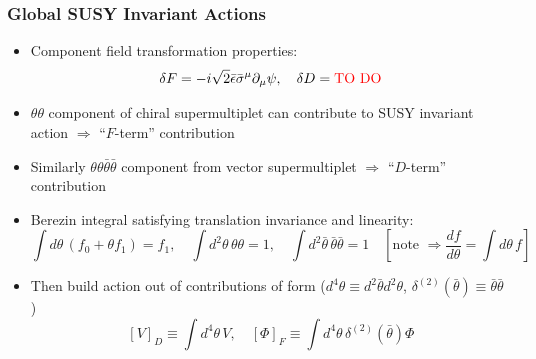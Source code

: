 \documentclass[10pt,aspectratio=169]{beamer}
\begin{document}
\begin{frame}
  \frametitle{Global SUSY Invariant Actions}
  \begin{itemize}\itemsep1em
  \item Component field transformation properties:
    \begin{equation*}
      \delta F = -i \sqrt{2} \bar{\epsilon} \bar{\sigma}^\mu \partial_\mu \psi ,
      \quad \delta D = {\color{red} \text{TO DO}}
    \end{equation*}
  \item $\theta \theta$ component of chiral supermultiplet
    can contribute to SUSY invariant action $\Rightarrow$ {\color{blue}
      ``$F$-term'' contribution}
  \item Similarly $\theta\theta\bar{\theta}\bar{\theta}$ component
    from vector supermultiplet $\Rightarrow$ {\color{blue} ``$D$-term''
      contribution}
  \item Berezin integral satisfying translation invariance and linearity:
    \begin{equation*}
      \int d\theta \, (f_0 + \theta f_1) = f_1 , \quad
      \int d^2 \theta \, \theta \theta = 1 , \quad
      \int d^2 \bar{\theta} \, \bar{\theta} \bar{\theta} = 1 \quad
      \left [ \text{note } \Rightarrow \frac{d f}{d\theta} = \int d\theta\,
        f \right ]
    \end{equation*}
  \item Then build action out of contributions of form
    ($d^4\theta \equiv d^2 \bar{\theta} d^2 \theta$,
    $\delta^{(2)}(\bar{\theta}) \equiv \bar{\theta} \bar{\theta}$ )
    \begin{equation*}
      \left [ V \right ]_D \equiv \int d^4\theta \, V , \quad
      \left [ \Phi \right ]_F \equiv \int d^4 \theta \, \delta^{(2)}(
      \bar{\theta}) \Phi
    \end{equation*}
  \end{itemize}
\end{frame}
\end{document}
